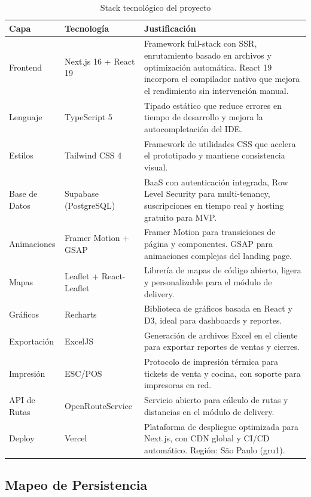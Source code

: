 \documentclass[12pt, a4paper]{article}
\begin{document}
\begin{table}[H]
\centering
\caption{Stack tecnológico del proyecto}
\begin{tabularx}{\textwidth}{|l|l|X|}
    \hline
    \textbf{Capa} & \textbf{Tecnología} & \textbf{Justificación} \\ \hline
    Frontend & Next.js 16 + React 19 & Framework full-stack con SSR, enrutamiento basado en archivos y optimización automática. React 19 incorpora el compilador nativo que mejora el rendimiento sin intervención manual. \\ \hline
    Lenguaje & TypeScript 5 & Tipado estático que reduce errores en tiempo de desarrollo y mejora la autocompletación del IDE. \\ \hline
    Estilos & Tailwind CSS 4 & Framework de utilidades CSS que acelera el prototipado y mantiene consistencia visual. \\ \hline
    Base de Datos & Supabase (PostgreSQL) & BaaS con autenticación integrada, Row Level Security para multi-tenancy, suscripciones en tiempo real y hosting gratuito para MVP. \\ \hline
    Animaciones & Framer Motion + GSAP & Framer Motion para transiciones de página y componentes. GSAP para animaciones complejas del landing page. \\ \hline
    Mapas & Leaflet + React-Leaflet & Librería de mapas de código abierto, ligera y personalizable para el módulo de delivery. \\ \hline
    Gráficos & Recharts & Biblioteca de gráficos basada en React y D3, ideal para dashboards y reportes. \\ \hline
    Exportación & ExcelJS & Generación de archivos Excel en el cliente para exportar reportes de ventas y cierres. \\ \hline
    Impresión & ESC/POS & Protocolo de impresión térmica para tickets de venta y cocina, con soporte para impresoras en red. \\ \hline
    API de Rutas & OpenRouteService & Servicio abierto para cálculo de rutas y distancias en el módulo de delivery. \\ \hline
    Deploy & Vercel & Plataforma de despliegue optimizada para Next.js, con CDN global y CI/CD automático. Región: São Paulo (gru1). \\ \hline
\end{tabularx}
\end{table}

\subsection{Mapeo de Persistencia}
\end{document}
